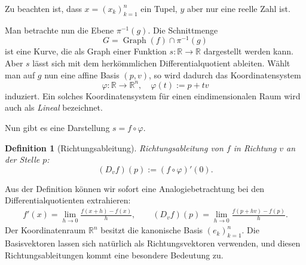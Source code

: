\documentclass[a4paper,11pt,fleqn,twoside]{scrartcl}
\numberwithin{equation}{section}
\newcommand{\R}{\mathbb R}
\theoremstyle{rmbox}
\newtheorem{Definition}{Definition}
\begin{document}
Zu beachten ist, dass $x=(x_k)_{k=1}^n$ ein
Tupel, $y$ aber nur eine reelle Zahl ist.

Man betrachte nun die Ebene $\pi^{-1}(g)$. Die
Schnittmenge
\begin{equation}
G=\operatorname{Graph}(f)\cap\pi^{-1}(g)
\end{equation}
ist eine Kurve, die als Graph einer Funktion $s\colon\R\to\R$
dargestellt werden kann. Aber $s$ lässt sich mit dem herkömmlichen
Differentialquotient ableiten. Wählt man auf $g$ nun eine affine
Basis $(p,v)$, so wird dadurch das Koordinatensystem
\begin{equation}
\varphi\colon\R\to\R^n,\quad\varphi(t):=p+tv
\end{equation}
induziert. Ein solches Koordinatensystem für einen eindimensionalen
Raum wird auch als \emph{Lineal} bezeichnet.

Nun gibt es eine Darstellung $s=f\circ\varphi$.

\begin{Definition}[Richtungsableitung]
\emph{Richtungsableitung} von $f$ in Richtung $v$
an der Stelle $p$:
\begin{equation}
(D_v f)(p) := (f\circ\varphi)'(0).
\end{equation}
\end{Definition}
\noindent
Aus der Definition können wir sofort eine Analogiebetrachtung
bei den Differentialquotienten extrahieren:
\begin{align}
f'(x) = \lim_{h\to 0}\frac{f(x+h)-f(x)}{h},\qquad
(D_v f)(p) = \lim_{h\to 0}\frac{f(p+hv)-f(p)}{h}.
\end{align}
Der Koordinatenraum $\R^n$ besitzt die kanonische Basis $(e_k)_{k=1}^n$.
Die Basisvektoren lassen sich natürlich als Richtungsvektoren
verwenden, und diesen Richtungsableitungen kommt eine besondere
Bedeutung zu.
\end{document}
